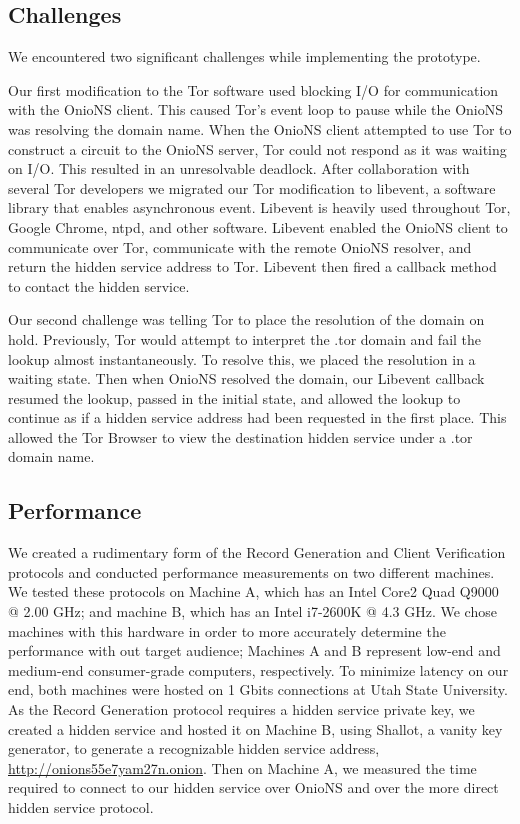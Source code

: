 \subsection{Challenges}

We encountered two significant challenges while implementing the prototype. 

Our first modification to the Tor software used blocking I/O for communication with the OnioNS client. This caused Tor's event loop to pause while the OnioNS was resolving the domain name. When the OnioNS client attempted to use Tor to construct a circuit to the OnioNS server, Tor could not respond as it was waiting on I/O. This resulted in an unresolvable deadlock. After collaboration with several Tor developers we migrated our Tor modification to libevent, a software library that enables asynchronous event. Libevent is heavily used throughout Tor, Google Chrome, ntpd, and other software. Libevent enabled the OnioNS client to communicate over Tor, communicate with the remote OnioNS resolver, and return the hidden service address to Tor. Libevent then fired a callback method to contact the hidden service.

Our second challenge was telling Tor to place the resolution of the domain on hold. Previously, Tor would attempt to interpret the .tor domain and fail the lookup almost instantaneously. To resolve this, we placed the resolution in a waiting state. Then when OnioNS resolved the domain, our Libevent callback resumed the lookup, passed in the initial state, and allowed the lookup to continue as if a hidden service address had been requested in the first place. This allowed the Tor Browser to view the destination hidden service under a .tor domain name.

\subsection{Performance}

We created a rudimentary form of the Record Generation and Client Verification protocols and conducted performance measurements on two different machines. We tested these protocols on Machine A, which has an Intel Core2 Quad Q9000 @ 2.00 GHz; and machine B, which has an Intel i7-2600K @ 4.3 GHz. We chose machines with this hardware in order to more accurately determine the performance with out target audience; Machines A and B represent low-end and medium-end consumer-grade computers, respectively. To minimize latency on our end, both machines were hosted on 1 Gbits connections at Utah State University. As the Record Generation protocol requires a hidden service private key, we created a hidden service and hosted it on Machine B, using Shallot, a vanity key generator, to generate a recognizable hidden service address, \url{http://onions55e7yam27n.onion}. Then on Machine A, we measured the time required to connect to our hidden service over OnioNS and over the more direct hidden service protocol.

